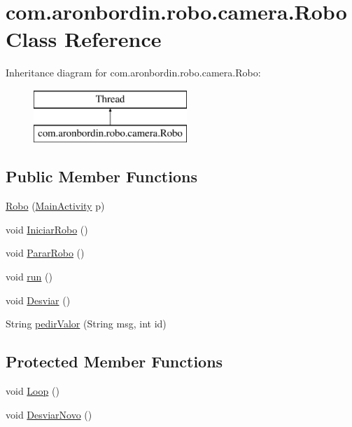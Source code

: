 \hypertarget{classcom_1_1aronbordin_1_1robo_1_1camera_1_1Robo}{\section{com.\+aronbordin.\+robo.\+camera.\+Robo Class Reference}
\label{classcom_1_1aronbordin_1_1robo_1_1camera_1_1Robo}
}
Inheritance diagram for com.\+aronbordin.\+robo.\+camera.\+Robo\+:\begin{figure}[H]
\begin{center}
\leavevmode
\includegraphics[height=2.000000cm]{df/d6a/classcom_1_1aronbordin_1_1robo_1_1camera_1_1Robo}
\end{center}
\end{figure}
\subsection*{Public Member Functions}
\begin{DoxyCompactItemize}
\item 
\hyperlink{classcom_1_1aronbordin_1_1robo_1_1camera_1_1Robo_a0480d3ff0c17c3acca728036f752c563}{Robo} (\hyperlink{classcom_1_1aronbordin_1_1robo_1_1camera_1_1MainActivity}{Main\+Activity} p)
\item 
void \hyperlink{classcom_1_1aronbordin_1_1robo_1_1camera_1_1Robo_a84b416945e3162ab1b1bb1dea5220339}{Iniciar\+Robo} ()
\item 
void \hyperlink{classcom_1_1aronbordin_1_1robo_1_1camera_1_1Robo_a7fbc061611f1fc6cdd362bedff8d2db4}{Parar\+Robo} ()
\item 
void \hyperlink{classcom_1_1aronbordin_1_1robo_1_1camera_1_1Robo_a04cd1e45ad45e03c773cc4e5ef7dbff7}{run} ()
\item 
void \hyperlink{classcom_1_1aronbordin_1_1robo_1_1camera_1_1Robo_af4c9ecee2838f22efd53f84b48e14c55}{Desviar} ()
\item 
String \hyperlink{classcom_1_1aronbordin_1_1robo_1_1camera_1_1Robo_af307e730541de825a3017353b06a8667}{pedir\+Valor} (String msg, int id)
\end{DoxyCompactItemize}
\subsection*{Protected Member Functions}
\begin{DoxyCompactItemize}
\item 
void \hyperlink{classcom_1_1aronbordin_1_1robo_1_1camera_1_1Robo_a390e1e83b708d7c8da9a87d76ac95638}{Loop} ()
\item 
void \hyperlink{classcom_1_1aronbordin_1_1robo_1_1camera_1_1Robo_ab13990860b0dff35e9316d57c56dcd73}{Desviar\+Novo} ()
\end{DoxyCompactItemize}


